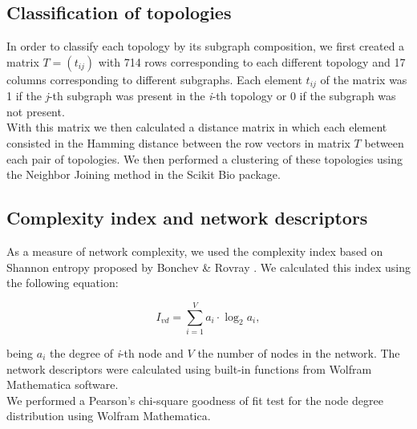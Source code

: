 \documentclass[10pt,letterpaper]{article}
\begin{document}
\subsection*{Classification of topologies}

In order to classify each topology by its subgraph composition, we first created
a matrix  $T = (t_{ij})$ with 714 rows corresponding to each different topology 
and 17 columns corresponding to different subgraphs. Each element $t_{ij}$ of 
the matrix was 1 if the \emph{j}-th subgraph was present in the \emph{i}-th 
topology or 0 if the subgraph was not present.\\

With this matrix we then calculated a distance matrix in which each element 
consisted in the Hamming distance between the row vectors in matrix $T$ between 
each pair of topologies. We then performed a clustering of these topologies 
using the Neighbor Joining method in the Scikit Bio package.

\subsection*{Complexity index and network descriptors}

As a measure of network complexity, we used the complexity index based on 
Shannon entropy proposed by Bonchev \& Rovray \cite{D.2005}. We calculated this 
index using the following equation:

\begin{equation}
 I_{vd} = \sum_{i=1}^V a_i \cdot \log_{2} a_i,
\end{equation}

being $a_i$ the degree of \emph{i}-th node and $V$ the number of nodes in the 
network. The network descriptors were calculated using built-in functions from 
Wolfram Mathematica software.\\

We performed a Pearson’s chi-square goodness of fit test for the node degree 
distribution using Wolfram Mathematica.


\end{document}
